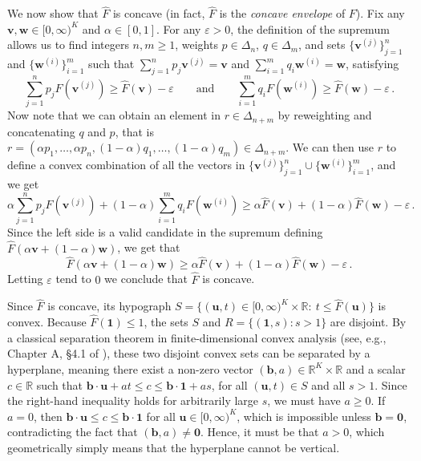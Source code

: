 \documentclass[3p, authoryear, 10pt]{elsarticle}%
\newcommand{\one}{\mathbf{1}}
\begin{document}
We now show that $\hat F$ is concave (in fact, $\hat F$ is the \emph{concave envelope} of $F$). Fix any $\mathbf{v}, \mathbf{w} \in [0,\infty)^K$ and $\alpha \in [0,1]$. For any $\varepsilon > 0$, the definition of the supremum allows us to find integers $n, m \ge 1$, weights $p \in \Delta_n$, $q \in \Delta_m$, and sets  $\{\mathbf{v}^{(j)}\}_{j=1}^n$ and $\{\mathbf{w}^{(i)}\}_{i=1}^m$ such that $\sum_{j=1}^n p_j \mathbf{v}^{(j)} = \mathbf{v}$ and $\sum_{i=1}^m q_i \mathbf{w}^{(i)} = \mathbf{w}$, satisfying
$$\sum_{j=1}^n p_j F(\mathbf{v}^{(j)}) \geq \hat F(\mathbf{v}) - \varepsilon \qquad \text{and} \qquad \sum_{i=1}^m q_i F(\mathbf{w}^{(i)}) \geq \hat F(\mathbf{w}) - \varepsilon\,.$$
Now note that we can obtain an element in $r\in\Delta_{n+m}$ by reweighting and concatenating $q$ and $p$, that is $r=(\alpha p_1, \dots, \alpha p_n, (1-\alpha) q_1,\dots, (1-\alpha)q_m)\in\Delta_{n+m}$. We can then use $r$ to define a convex combination of all the vectors in $\{\mathbf{v}^{(j)}\}_{j=1}^n\cup\{\mathbf{w}^{(i)}\}_{i=1}^m$, and we get
$$\alpha \sum_{j=1}^n p_j F(\mathbf{v}^{(j)}) + (1-\alpha) \sum_{i=1}^m q_i F(\mathbf{w}^{(i)}) \geq \alpha \hat F(\mathbf{v}) + (1-\alpha) \hat F(\mathbf{w}) - \varepsilon\,.$$
Since the left side is a valid candidate in the supremum defining $\hat F(\alpha \mathbf{v} + (1-\alpha)\mathbf{w})$, we get that $$\hat F(\alpha \mathbf{v} + (1-\alpha)\mathbf{w}) \geq \alpha \hat F(\mathbf{v}) + (1-\alpha) \hat F(\mathbf{w}) - \varepsilon\,.$$ Letting $\varepsilon$ tend to $0$ we conclude that $\hat F$ is concave. 

Since $\hat F$ is concave, its hypograph $S=\{(\mathbf u,t)\in[0,\infty)^K\times\mathbb R:\ t\le \hat F(\mathbf u)\}$ is convex. Because $\hat F(\one)\leq 1$, the sets $S$ and $R=\{(\one,s): s>1\}$ are disjoint. By a classical separation theorem in finite-dimensional convex analysis (see, e.g., Chapter A, \S4.1 of \citealt{hiriart-urruty2001fundamentals}), these two disjoint convex sets can be separated by a hyperplane, meaning there exist a non-zero vector $(\mathbf b,a)\in\mathbb R^K\times\mathbb R$ and a scalar $c\in\mathbb R$ such that $\mathbf b\cdot\mathbf u + a t \le c \le \mathbf b\cdot\one + a s$, for all $(\mathbf u,t)\in S$ and all $s>1$.
Since the right-hand inequality holds for arbitrarily large $s$, we must have $a\ge 0$. If $a=0$, then
$\mathbf b\cdot\mathbf u\le c\le \mathbf b\cdot\one$ for all $ \mathbf u\in[0,\infty)^K$,
which is impossible unless $\mathbf b=\mathbf 0$, contradicting the fact that $(\mathbf b,a)\neq \mathbf 0$. Hence, it must be that $a>0$, which geometrically simply means that the hyperplane cannot be vertical.
\end{document}
